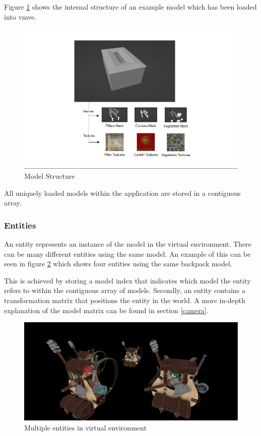 \documentclass[11pt]{article}
\begin{document}
Figure \ref{fig:model} shows the internal structure of an example model which
has been loaded into \gls{vmve}.
\begin{figure}[h!]
  \centering
  \includegraphics[width=\textwidth]{images/model.png}
  \caption{Model Structure}
  \label{fig:model}
\end{figure}

All uniquely loaded models within the application are stored in a contiguous
array. 

\subsubsection{Entities}
An entity represents an instance of the model in the virtual environment. There
can be many different entities using the same model. An example of this can be
seen in figure \ref{fig:entities} which shows four entities using the same
backpack model.

This is achieved by storing a model index that indicates which model the entity
refers to within the contiguous array of models. Secondly, an entity contains a
transformation matrix that positions the entity in the world. A more in-depth
explanation of the model matrix can be found in section \ref{camera}.

\begin{figure}[h!]
  \centering
  \includegraphics[width=\textwidth]{images/entities.png}
  \caption{Multiple entities in virtual environment}
  \label{fig:entities}
\end{figure}
\end{document}
